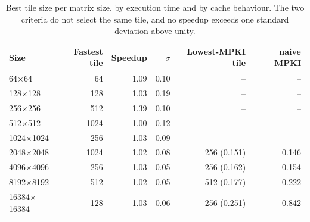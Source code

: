 \begin{table}[htbp]
\centering
\small
\caption{Best tile size per matrix size, by execution time and by cache behaviour. The two criteria do not select the same tile, and no speedup exceeds one standard deviation above unity.}
\label{tab:tile-best}
\begin{tabular}{lrrrrr}
\toprule
Size & Fastest tile & Speedup & $\sigma$ & Lowest-MPKI tile & naive MPKI \\
\midrule
64$\times$64 & 64 & 1.09 & 0.10 & -- & -- \\
128$\times$128 & 128 & 1.03 & 0.19 & -- & -- \\
256$\times$256 & 512 & 1.39 & 0.10 & -- & -- \\
512$\times$512 & 1024 & 1.00 & 0.12 & -- & -- \\
1024$\times$1024 & 256 & 1.03 & 0.09 & -- & -- \\
2048$\times$2048 & 1024 & 1.02 & 0.08 & 256 (0.151) & 0.146 \\
4096$\times$4096 & 256 & 1.03 & 0.05 & 256 (0.162) & 0.154 \\
8192$\times$8192 & 512 & 1.02 & 0.05 & 512 (0.177) & 0.222 \\
16384$\times$16384 & 128 & 1.03 & 0.06 & 256 (0.251) & 0.842 \\
\bottomrule
\end{tabular}
\end{table}
